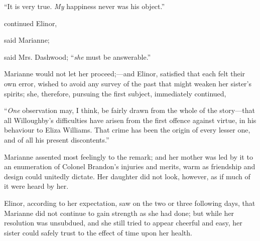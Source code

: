 “It is very true. {\em My} happiness never was his object.”

 continued Elinor, 

 said Marianne; 

 said Mrs. Dashwood; “{\em she} must be answerable.”

Marianne would not let her proceed;---and Elinor, satisfied that each felt their own error, wished to avoid any survey of the past that might weaken her sister's spirits; she, therefore, pursuing the first subject, immediately continued,

“{\em One} observation may, I think, be fairly drawn from the whole of the story---that all Willoughby's difficulties have arisen from the first offence against virtue, in his behaviour to Eliza Williams. That crime has been the origin of every lesser one, and of all his present discontents.”

Marianne assented most feelingly to the remark; and her mother was led by it to an enumeration of Colonel Brandon's injuries and merits, warm as friendship and design could unitedly dictate. Her daughter did not look, however, as if much of it were heard by her.

Elinor, according to her expectation, saw on the two or three following days, that Marianne did not continue to gain strength as she had done; but while her resolution was unsubdued, and she still tried to appear cheerful and easy, her sister could safely trust to the effect of time upon her health.

